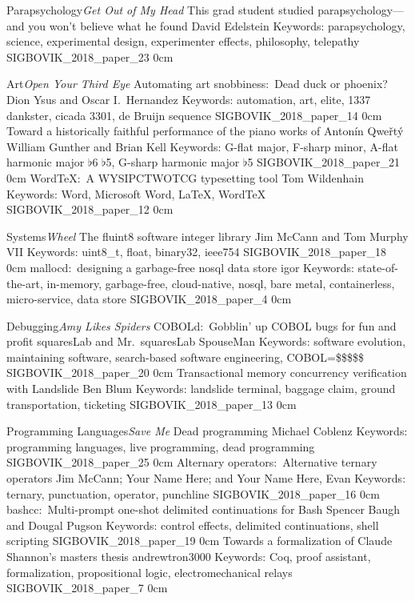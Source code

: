 \addtrack
	{Parapsychology}{\textit{Get Out of My Head}}
\addpaper
	{This grad student studied parapsychology---and you won't believe what he found}
	{David Edelstein}
	{Keywords: parapsychology, science, experimental design, experimenter effects, philosophy, telepathy}
	{SIGBOVIK_2018_paper_23}
	{0cm}
	{}

\addtrack
	{Art}{\textit{Open Your Third Eye}}
\addpaper
	{Automating art snobbiness:\ Dead duck or phoenix?}
	{Dion Ysus and Oscar I.\ Hernandez}
	{Keywords: automation, art, elite, 1337 dankster, cicada 3301, de Bruijn sequence}
	{SIGBOVIK_2018_paper_14}
	{0cm}
	{}
\addpaper
	{Toward a historically faithful performance of the piano works of Anton\'in Qwe\v{r}t\'y}
	{William Gunther and Brian Kell}
	{Keywords: G-flat major, F-sharp minor, A-flat harmonic major $\flat$6 $\flat$5, G-sharp harmonic major $\flat$5}
	{SIGBOVIK_2018_paper_21}
	{0cm}
	{}
\addpaper
	{WordTeX:\ A WYSIPCTWOTCG typesetting tool}
	{Tom Wildenhain}
	{Keywords: Word, Microsoft Word, LaTeX, WordTeX}
	{SIGBOVIK_2018_paper_12}
	{0cm}
	{}


\addtrack
	{Systems}{\textit{Wheel}}
\addpaper
	{The fluint8 software integer library}
	{Jim McCann and Tom Murphy VII}
	{Keywords: uint8\_t, float, binary32, ieee754}
	{SIGBOVIK_2018_paper_18}
	{0cm}
	{}
\addpaper
	{mallocd:\ designing a garbage-free nosql data store}
	{igor}
	{Keywords: state-of-the-art, in-memory, garbage-free, cloud-native, nosql, bare metal, containerless, micro-service, data store}
	{SIGBOVIK_2018_paper_4}
	{0cm}
	{}

\addtrack
	{Debugging}{\textit{Amy Likes Spiders}}
\addpaper
	{COBOLd:\ Gobblin' up COBOL bugs for fun and profit}
	{squaresLab and Mr.\ squaresLab SpouseMan}
	{Keywords: software evolution, maintaining software, search-based software engineering, COBOL=\$\$\$\$\$}
	{SIGBOVIK_2018_paper_20}
	{0cm}
	{}
\addpaper
	{Transactional memory concurrency verification with Landslide}
	{Ben Blum}
	{Keywords: landslide terminal, baggage claim, ground transportation, ticketing}
	{SIGBOVIK_2018_paper_13}
	{0cm}
	{}

\addtrack
	{Programming Languages}{\textit{Save Me}}
\addpaper
	{Dead programming}
	{Michael Coblenz}
	{Keywords: programming languages, live programming, dead programming}
	{SIGBOVIK_2018_paper_25}
	{0cm}
	{}
\addpaper
	{Alternary operators:\ Alternative ternary operators}
	{Jim McCann; Your Name Here; and Your Name Here, Evan}
	{Keywords: ternary, punctuation, operator, punchline}
	{SIGBOVIK_2018_paper_16}
	{0cm}
	{}
\addpaper
	{bashcc:\ Multi-prompt one-shot delimited continuations for Bash}
	{Spencer Baugh and Dougal Pugson}
	{Keywords: control effects, delimited continuations, shell scripting}
	{SIGBOVIK_2018_paper_19}
	{0cm}
	{}
\addpaper
	{Towards a formalization of Claude Shannon's masters thesis}
	{andrewtron3000}
	{Keywords: Coq, proof assistant, formalization, propositional logic, electromechanical relays}
	{SIGBOVIK_2018_paper_7}
	{0cm}
	{}

